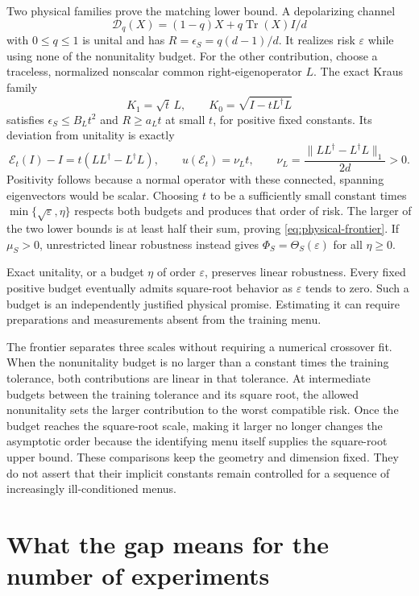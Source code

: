 \documentclass[11pt,a4paper]{article}
\newcommand{\Tr}{\operatorname{Tr}}
\numberwithin{equation}{section}
\begin{document}
Two physical families prove the matching lower bound. A depolarizing channel
\[
 \mathcal D_q(X)=(1-q)X+q\Tr(X)I/d
\]
with $0\le q\le1$ is unital and has $R=\epsilon_S=q(d-1)/d$. It realizes risk $\varepsilon$ while using none of the nonunitality budget. For the other contribution, choose a traceless, normalized nonscalar common right-eigenoperator $L$. The exact Kraus family
\[
 K_1=\sqrt t\,L,
 \qquad K_0=\sqrt{I-tL^\dagger L}
\]
satisfies $\epsilon_S\le B_Lt^2$ and $R\ge a_Lt$ at small $t$, for positive fixed constants. Its deviation from unitality is exactly
\[
 \mathcal E_t(I)-I=t(LL^\dagger-L^\dagger L),
 \qquad u(\mathcal E_t)=\nu_Lt,
 \qquad \nu_L=\frac{\|LL^\dagger-L^\dagger L\|_1}{2d}>0.
\]
Positivity follows because a normal operator with these connected, spanning eigenvectors would be scalar. Choosing $t$ to be a sufficiently small constant times $\min\{\sqrt\varepsilon,\eta\}$ respects both budgets and produces that order of risk. The larger of the two lower bounds is at least half their sum, proving \eqref{eq:physical-frontier}. If $\mu_S>0$, unrestricted linear robustness instead gives $\Phi_S=\Theta_S(\varepsilon)$ for all $\eta\ge0$.

Exact unitality, or a budget $\eta$ of order $\varepsilon$, preserves linear robustness. Every fixed positive budget eventually admits square-root behavior as $\varepsilon$ tends to zero. Such a budget is an independently justified physical promise. Estimating it can require preparations and measurements absent from the training menu.

The frontier separates three scales without requiring a numerical crossover fit. When the nonunitality budget is no larger than a constant times the training tolerance, both contributions are linear in that tolerance. At intermediate budgets between the training tolerance and its square root, the allowed nonunitality sets the larger contribution to the worst compatible risk. Once the budget reaches the square-root scale, making it larger no longer changes the asymptotic order because the identifying menu itself supplies the square-root upper bound. These comparisons keep the geometry and dimension fixed. They do not assert that their implicit constants remain controlled for a sequence of increasingly ill-conditioned menus.


\section{What the gap means for the number of experiments}
\label{dc:certification}
\end{document}
